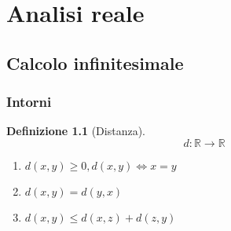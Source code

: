 \documentclass[a4paper,12pt]{report}
\theoremstyle{mystyle}
\newtheorem{definition}[theorem]{Definizione}
\begin{document}
\begin{titlepage}
\begin{comment}
        \foreach \i in {0,60,...,300} {
          \draw[fill=white] (30+\i:1.2cm) circle (0.5cm);
          \foreach \j in {0,12,...,348} {
            \draw[thin] (30+\i:1.2cm) --+(\j:0.5cm);
          }
        }
        \foreach \i in {0,60,...,300} {
          \draw[fill=white] (\i:1.2cm) circle (0.5cm);
          \foreach \j in {0,12,...,348} {
            \draw[thin] (\i:1.2cm) --+(\j:0.5cm);
          }
        }
        
        \foreach \i in {0,20,...,340} {
          \draw[fill=white] (\i:1.2cm) circle (0.21cm);
          \draw[fill=black] (\i:1.2cm) circle (0.13cm);
        }
        
        \draw[fill=white] (0,0) circle (1.2cm);
        \draw[ultra thick] (0,0) circle (0.35cm);
        \draw[thick] (0,0) circle (0.75cm);
        \draw[thick] (0,0) circle (1cm);
        
        \draw[decorate, decoration={shape backgrounds,shape=circle,shape size=0.5mm,shape sep=0.83mm}, fill=black] (0,0) circle (0.87cm);
        
        \foreach \i in {0,10,...,350} {
          \draw[rotate=\i] (0.35,0)--(0.75,0);
        }
        \foreach \i in {0,20,...,340} {
          \draw[rotate=\i] (1,0)--(1.2,0);
        }
        
        
        \end{tikzpicture}
\end{comment}
    
    \vfill
\end{titlepage}

\tableofcontents

\newpage

\part{Analisi reale}

\chapter{Calcolo infinitesimale}

\section{Intorni}

\begin{definition}[Distanza]
    \[d: \mathbb R \to \mathbb R\]

    \begin{enumerate}[label=\roman*.]
        \[\newline\]
        \item \( d(x,y) \geq 0 , d(x,y) \Leftrightarrow x=y\)
        \item \(d(x,y) = d(y,x)\)
        \item \(d(x,y) \leq d(x,z) + d(z,y)\)
    \end{enumerate}

\end{definition}
\end{document}
